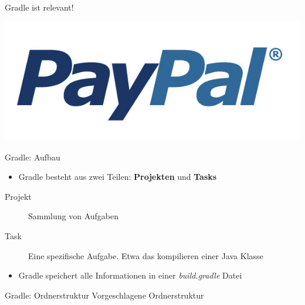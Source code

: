 \documentclass{beamer}
\begin{document}
\begin{frame}{Gradle ist relevant!}
	\hspace*{2cm}\begin{minipage}{0.49\linewidth}
		\includegraphics[width=\linewidth]{paypal_logo.jpg}
	\end{minipage}
\end{frame}
\begin{frame}{Gradle: Aufbau}
	\begin{itemize}
		\item Gradle besteht aus zwei Teilen: \textbf{Projekten} und \textbf{Tasks}
	\end{itemize}
	\begin{description}
		\item[Projekt] Sammlung von Aufgaben
		\item[Task] Eine spezifische Aufgabe. Etwa das kompilieren einer Java Klasse 
	\end{description}
	\begin{itemize}
		\item Gradle speichert alle Informationen in einer \textit{build.gradle} Datei 
	\end{itemize}
\end{frame}

\begin{frame}{Gradle: Ordnerstruktur}
	Vorgeschlagene Ordnerstruktur
\end{frame}
\end{document}
